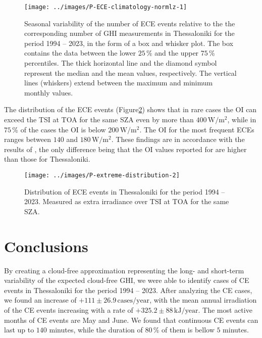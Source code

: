 \documentclass[preprint, 5p,
authoryear]{elsarticle} %
\begin{document}
\begin{figure}

{\centering \texttt{[image: ../images/P-ECE-climatology-normlz-1]} 

}

\caption{Seasonal variability of the number of ECE events relative to the the corresponding number of GHI measurements in Thessaloniki for the period 1994 -- 2023, in the form of a box and whisker plot. The box contains the data between the lower $25\,\%$ and the upper $75\,\%$ percentiles. The thick horizontal line and the diamond symbol represent the median and the mean values, respectively. The vertical lines (whiskers) extend between the maximum and minimum monthly values.}\label{fig:relative-month-occurancies-ECE}
\end{figure}

The distribution of the ECE events
(Figure\nobreakspace{}\ref{fig:P-extreme-distribution}) shows that in
rare cases the OI can exceed the TSI at TOA for the same SZA even by
more than \(400\,\text{W}/\text{m}^2\), while in \(75\,\%\) of the cases
the OI is below \(200\,\text{W}/\text{m}^2\). The OI for the most
frequent ECEs ranges between \(140\) and \(180\,\text{W}/\text{m}^2\).
These findings are in accordance with the results of
\citet{Vamvakas2020}, the only difference being that the OI values
reported for are higher than those for Thessaloniki.

\begin{figure}

{\centering \texttt{[image: ../images/P-extreme-distribution-2]} 

}

\caption{Distribution of ECE events in Thessaloniki for the period 1994 -- 2023. Measured as extra irradiance over TSI at TOA for the same SZA.}\label{fig:P-extreme-distribution}
\end{figure}

\hypertarget{conclusions}{%
\section{Conclusions}\label{conclusions}}

By creating a cloud-free approximation representing the long- and
short-term variability of the expected cloud-free GHI, we were able to
identify cases of CE events in Thessaloniki for the period 1994 -- 2023.
After analyzing the CE cases, we found an increase of
\(+111\pm 26.9\,\text{cases}/\text{year}\), with the mean annual
irradiation of the CE events increasing with a rate of
\(+325.2\pm 88\,\text{kJ}/\text{year}\). The most active months of CE
events are May and June. We found that continuous CE events can last up
to \(140\) minutes, while the duration of \(80\,\%\) of them is bellow
\(5\) minutes.
\end{document}
